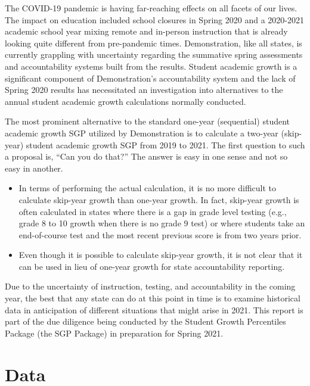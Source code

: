 \documentclass[12pt]{article}
\providecommand{\tightlist}{%
  \setlength{\itemsep}{0pt}\setlength{\parskip}{0pt}}
\begin{document}
The COVID-19 pandemic is having far-reaching effects on all facets of
our lives. The impact on education included school closures in Spring
2020 and a 2020-2021 academic school year mixing remote and in-person
instruction that is already looking quite different from pre-pandemic
times. Demonstration, like all states, is currently grappling with
uncertainty regarding the summative spring assessments and
accountability systems built from the results. Student academic growth
is a significant component of Demonstration's accountability system and
the lack of Spring 2020 results has necessitated an investigation into
alternatives to the annual student academic growth calculations normally
conducted.

The most prominent alternative to the standard one-year (sequential)
student academic growth SGP utilized by Demonstration is to calculate a
two-year (skip-year) student academic growth SGP from 2019 to 2021. The
first question to such a proposal is, ``Can you do that?'' The answer is
easy in one sense and not so easy in another.

\begin{itemize}
\tightlist
\item
  In terms of performing the actual calculation, it is no more difficult
  to calculate skip-year growth than one-year growth. In fact, skip-year
  growth is often calculated in states where there is a gap in grade
  level testing (e.g., grade 8 to 10 growth when there is no grade 9
  test) or where students take an end-of-course test and the most recent
  previous score is from two years prior.
\item
  Even though it is possible to calculate skip-year growth, it is not
  clear that it can be used in lieu of one-year growth for state
  accountability reporting.
\end{itemize}

\noindent Due to the uncertainty of instruction, testing, and
accountability in the coming year, the best that any state can do at
this point in time is to examine historical data in anticipation of
different situations that might arise in 2021. This report is part of
the due diligence being conducted by the Student Growth Percentiles
Package (the SGP Package) in preparation for Spring 2021.

\hypertarget{data}{%
\section{Data}\label{data}}
\end{document}
